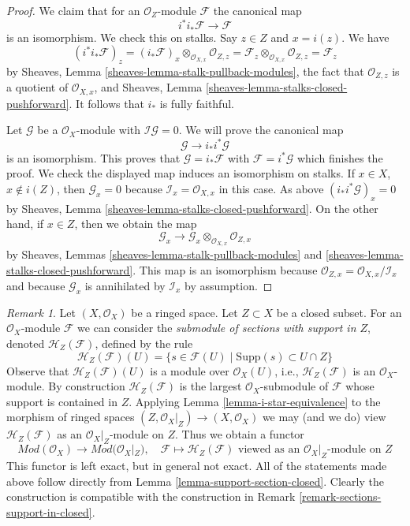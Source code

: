 \documentclass{stacks-project}
\theoremstyle{plain}
\theoremstyle{definition}
\theoremstyle{remark}
\newtheorem{remark}[subsection]{Remark}
\numberwithin{equation}{subsection}
\begin{document}
\begin{proof}
We claim that for an $\mathcal{O}_Z$-module $\mathcal{F}$ the canonical map
$$
i^*i_*\mathcal{F} \longrightarrow \mathcal{F}
$$
is an isomorphism. We check this on stalks. Say $z \in Z$ and $x = i(z)$.
We have
$$
(i^*i_*\mathcal{F})_z =
(i_*\mathcal{F})_x \otimes_{\mathcal{O}_{X, x}} \mathcal{O}_{Z, z} =
\mathcal{F}_z \otimes_{\mathcal{O}_{X, x}} \mathcal{O}_{Z, z} =
\mathcal{F}_z
$$
by Sheaves, Lemma \ref{sheaves-lemma-stalk-pullback-modules},
the fact that $\mathcal{O}_{Z, z}$ is a quotient of $\mathcal{O}_{X, x}$, and
Sheaves, Lemma \ref{sheaves-lemma-stalks-closed-pushforward}.
It follows that $i_*$ is fully faithful.

\medskip\noindent
Let $\mathcal{G}$ be a $\mathcal{O}_X$-module with
$\mathcal{I}\mathcal{G} = 0$. We will prove the canonical map
$$
\mathcal{G} \longrightarrow i_*i^*\mathcal{G}
$$
is an isomorphism. This proves that $\mathcal{G} = i_*\mathcal{F}$
with $\mathcal{F} = i^*\mathcal{G}$ which finishes the proof.
We check the displayed map induces an isomorphism on stalks.
If $x \in X$, $x \not \in i(Z)$, then $\mathcal{G}_x = 0$
because $\mathcal{I}_x = \mathcal{O}_{X, x}$ in this
case. As above $(i_*i^*\mathcal{G})_x = 0$ by
Sheaves, Lemma \ref{sheaves-lemma-stalks-closed-pushforward}.
On the other hand, if $x \in Z$, then we obtain the map
$$
\mathcal{G}_x
\longrightarrow
\mathcal{G}_x \otimes_{\mathcal{O}_{X, x}} \mathcal{O}_{Z, x}
$$
by Sheaves, Lemmas \ref{sheaves-lemma-stalk-pullback-modules} and
\ref{sheaves-lemma-stalks-closed-pushforward}. This map is an isomorphism
because $\mathcal{O}_{Z, x} = \mathcal{O}_{X, x}/\mathcal{I}_x$
and because $\mathcal{G}_x$ is annihilated by $\mathcal{I}_x$ by assumption.
\end{proof}

\begin{remark}
\label{remark-sections-support-in-closed-modules}
Let $(X, \mathcal{O}_X)$ be a ringed space. Let $Z \subset X$ be
a closed subset. For an $\mathcal{O}_X$-module $\mathcal{F}$ we can
consider the {\it submodule of sections with support in $Z$}, denoted
$\mathcal{H}_Z(\mathcal{F})$, defined by the rule
$$
\mathcal{H}_Z(\mathcal{F})(U) =
\{s \in \mathcal{F}(U) \mid \text{Supp}(s) \subset U \cap Z\}
$$
Observe that $\mathcal{H}_Z(\mathcal{F})(U)$ is a module over
$\mathcal{O}_X(U)$, i.e., $\mathcal{H}_Z(\mathcal{F})$ is an
$\mathcal{O}_X$-module. By construction $\mathcal{H}_Z(\mathcal{F})$
is the largest $\mathcal{O}_X$-submodule of $\mathcal{F}$ whose support is
contained in $Z$.
Applying Lemma \ref{lemma-i-star-equivalence} to
the morphism of ringed spaces $(Z, \mathcal{O}_X|_Z) \to (X, \mathcal{O}_X)$ we
may (and we do) view
$\mathcal{H}_Z(\mathcal{F})$ as an $\mathcal{O}_X|_Z$-module on $Z$.
Thus we obtain a functor
$$
\textit{Mod}(\mathcal{O}_X) \longrightarrow \textit{Mod}(\mathcal{O}_X|_Z),
\quad
\mathcal{F} \longmapsto \mathcal{H}_Z(\mathcal{F})
\text{ viewed as an }\mathcal{O}_X|_Z\text{-module on }Z
$$
This functor is left exact, but in general not exact.
All of the statements made above follow directly from
Lemma \ref{lemma-support-section-closed}.
Clearly the construction is compatible with the construction in
Remark \ref{remark-sections-support-in-closed}.
\end{remark}
\end{document}

